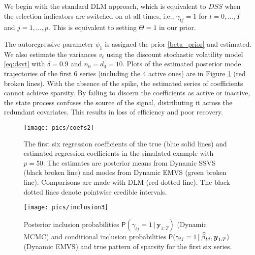 \documentclass[ba]{imsart}
\numberwithin{equation}{section}
\theoremstyle{plain}
\def\B{\mbox{\boldmath$B$}}
\def\y{\mbox{\boldmath$y$}}
\def\b{\mbox{\boldmath$b$}}
\def\B{\mbox{\boldmath$B$}}
\newcommand{\bm}[1]{\boldsymbol{#1}}
\renewcommand{\P}{\mathsf{P}}
\newcommand{\Y}{\bm{Y}}
\newcommand{\wh}[1]{\smash{\widehat{#1}}}
\def\C {\,|\:}
\def\C {\,|\:}
\def\B{\bm{B}}
\def\Y{\bm{Y}}
\def\y{\bm{y}}
\def\b{\bm{\beta}}
\begin{document}
We begin with the standard DLM approach, which is equivalent to  $DSS$ when the selection indicators are switched on at all times, i.e.,  $\gamma_{tj}=1$ for $t=0,\dots, T$ and $j=1,\dots,p$. 
This is equivalent to setting $\Theta=1$ in our prior. %
{The autoregressive parameter $\phi_1$ is assigned the prior \eqref{beta_prior} and estimated. We also estimate the variances $v_t$ using the discount stochastic volatility  model \eqref{eq:dsvt} with $\delta=0.9$ and $n_0=d_0=10$.  
Plots of the estimated posterior mode trajectories of the
first $6$ series (including the $4$ active ones) are in Figure \ref{fig_simul} (red broken lines).  With the absence of the spike, the estimated series of coefficients cannot achieve sparsity. 
By failing to discern the coefficients as active or inactive, the state process confuses the source of the signal, distributing it across the redundant covariates. 
This results in loss of efficiency and  poor recovery.




 \begin{figure}[t!]
\begin{center}
\texttt{[image: pics/coefs2]}
\end{center}
\caption{The first six regression coefficients of the true (blue solid lines) and estimated  regression coefficients in  the simulated example with $p=50$. The estimates are posterior means from Dynamic SSVS (black broken line) and modes from Dynamic EMVS (green broken line). Comparisons are made with DLM (red dotted line). The black dotted lines denote pointwise credible intervals. }\label{fig_simul}
\end{figure}

 \begin{figure}[htbp!]
\begin{center}
\texttt{[image: pics/inclusion3]}
\end{center}
\caption{Posterior inclusion probabilities  $\P(\gamma_{tj}=1\C\y_{1:T})$ (Dynamic MCMC) and conditional inclusion probabilities  $\P(\gamma_{tj}=1\C\wh\beta_{tj}, \y_{1:T})$ (Dynamic EMVS) and true pattern of sparsity for the first six series.}\label{fig_theta}
\end{figure}


}
\end{document}
